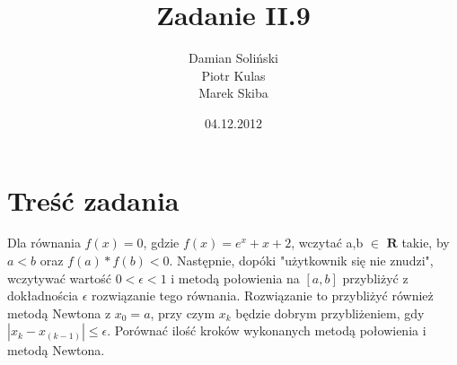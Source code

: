\documentclass[11pt]{article}
\title{\textbf{Zadanie II.9}}
\author{Damian Soliński\\
		Piotr Kulas\\
		Marek Skiba}
\date{04.12.2012}
\begin{document}
\maketitle

\section{Treść zadania}

Dla równania $f(x) = 0$, gdzie $f(x) = e^x + x + 2$, wczytać a,b $\in$ $\mathbf{R}$ takie, by $a<b$ oraz $f(a) * f(b) < 0$. Następnie, dopóki "użytkownik się nie znudzi", wczytywać wartość $0 < \epsilon < 1$ i metodą połowienia na $[a,b]$ przybliżyć z dokładnościa $\epsilon$ rozwiązanie tego równania. Rozwiązanie to przybliżyć również metodą Newtona z $x_0 = a$, przy czym $x_k$ będzie dobrym przybliżeniem, gdy $|x_k - x_(k-1)| \leq \epsilon$. Porównać ilość kroków wykonanych metodą połowienia i metodą Newtona.
\end{document}
